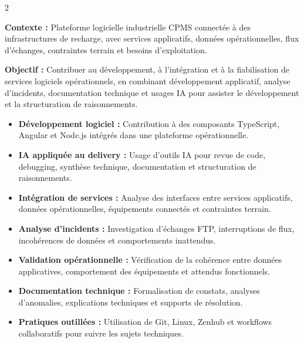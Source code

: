\documentclass[8pt,a4paper,ragged2e,withhyper]{altacv}
\begin{document}



\makecvheader
\vspace{-0.3cm}


\begin{paracol}{2}



\textbf{Contexte :} Plateforme logicielle industrielle CPMS connectée à des infrastructures de recharge, avec services applicatifs, données opérationnelles, flux d’échanges, contraintes terrain et besoins d’exploitation.

\textbf{Objectif :} Contribuer au développement, à l’intégration et à la fiabilisation de services logiciels opérationnels, en combinant développement applicatif, analyse d’incidents, documentation technique et usages IA pour assister le développement et la structuration de raisonnements.

\begin{itemize}
  \item \textbf{Développement logiciel :} Contribution à des composants TypeScript, Angular et Node.js intégrés dans une plateforme opérationnelle.
  \item \textbf{IA appliquée au delivery :} Usage d’outils IA pour revue de code, debugging, synthèse technique, documentation et structuration de raisonnements.
  \item \textbf{Intégration de services :} Analyse des interfaces entre services applicatifs, données opérationnelles, équipements connectés et contraintes terrain.
  \item \textbf{Analyse d’incidents :} Investigation d’échanges FTP, interruptions de flux, incohérences de données et comportements inattendus.
  \item \textbf{Validation opérationnelle :} Vérification de la cohérence entre données applicatives, comportement des équipements et attendus fonctionnels.
  \item \textbf{Documentation technique :} Formalisation de constats, analyses d’anomalies, explications techniques et supports de résolution.
  \item \textbf{Pratiques outillées :} Utilisation de Git, Linux, Zenhub et workflows collaboratifs pour suivre les sujets techniques.
\end{itemize}


\end{paracol}
\end{document}
